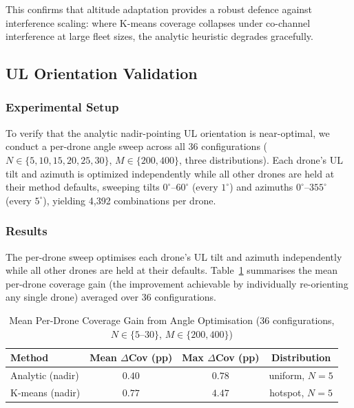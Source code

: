 \documentclass[conference]{IEEEtran}
\begin{document}
This confirms that altitude adaptation provides a robust defence against interference scaling: where K-means coverage collapses under co-channel interference at large fleet sizes, the analytic heuristic degrades gracefully.

\subsection{UL Orientation Validation}
\label{sec:orientation_validation}

\subsubsection{Experimental Setup}

To verify that the analytic nadir-pointing UL orientation is near-optimal, we conduct a per-drone angle sweep across all 36 configurations ($N \in \{5,10,15,20,25,30\}$, $M \in \{200, 400\}$, three distributions). Each drone's UL tilt and azimuth is optimized independently while all other drones are held at their method defaults, sweeping tilts $0^\circ$--$60^\circ$ (every $1^\circ$) and azimuths $0^\circ$--$355^\circ$ (every $5^\circ$), yielding 4{,}392 combinations per drone.

\subsubsection{Results}

The per-drone sweep optimises each drone's UL tilt and azimuth independently while all other drones are held at their defaults.
Table~\ref{tab:orientation_sweep} summarises the mean per-drone coverage gain (the improvement achievable by individually re-orienting any single drone) averaged over 36 configurations.

\begin{table}[t]
\centering
\caption{Mean Per-Drone Coverage Gain from Angle Optimisation (36 configurations, $N \in \{5\text{--}30\}$, $M \in \{200, 400\}$)}
\label{tab:orientation_sweep}
\begin{tabular}{@{}lccc@{}}
\toprule
Method & Mean $\Delta$Cov (pp) & Max $\Delta$Cov (pp) & Distribution \\
\midrule
Analytic (nadir) & $0.40$ & $0.78$ & uniform, $N{=}5$ \\
K-means (nadir)  & $0.77$ & $4.47$ & hotspot, $N{=}5$ \\
\bottomrule
\end{tabular}
\end{table}
\end{document}
